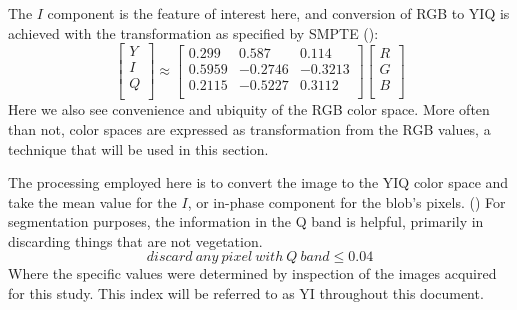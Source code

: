 \documentclass[letterpaper, notitlepage]{report}
\begin{document}
{The $I$ component is the feature of interest here, and conversion of RGB to YIQ is achieved with the transformation as specified by SMPTE (\citeyear{SMPTE2005-xl}):
\begin{equation}
	\begin{bmatrix}
	Y \\[0.3em]
	I \\[0.3em]
	Q \\[0.3em]
	\end{bmatrix}
	\approx
	\begin{bmatrix}
	0.299 & 0.587 & 0.114 \\[0.3em]
	0.5959 & -0.2746 & -0.3213\\[0.3em]
	0.2115 & -0.5227 & 0.3112 \\[0.3em]
	\end{bmatrix}
	\begin{bmatrix}
	R \\[0.3em]
	G \\[0.3em]
	B \\[0.3em]
	\end{bmatrix}	
\end{equation}
Here we also see convenience and ubiquity of the RGB color space. More often than not, color spaces are expressed as transformation from the RGB values, a technique that will be used in this section.



The processing employed here is to convert the image to the YIQ color space and take the mean value for the $I$, or in-phase component for the blob's pixels. (\cite{MathWorks_undated-jg}) For segmentation purposes, the information in the Q band is helpful, primarily in discarding things that are not vegetation.
\begin{equation}\label{eqn:yiq-index}
	discard\ any\ pixel\ with\ Q\ band\leq 0.04
\end{equation}
Where the specific values were determined by inspection of the images acquired for this study. This index will be referred to as YI throughout this document.

}
\end{document}
